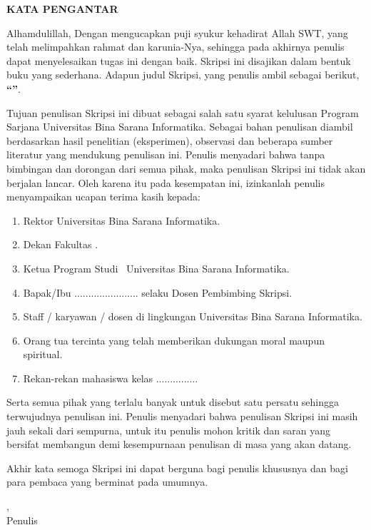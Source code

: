 ﻿\clearpage
{}
\begin{center}
    \textbf{\large KATA PENGANTAR}
\end{center}
\vspace{1cm}
Alhamdulillah, Dengan mengucapkan puji syukur kehadirat Allah SWT, yang telah melimpahkan rahmat dan karunia-Nya, sehingga pada akhirnya penulis dapat menyelesaikan tugas ini dengan baik. Skripsi ini disajikan dalam bentuk buku yang sederhana. Adapun judul Skripsi, yang penulis ambil sebagai berikut, \textbf{“\Judul”}.

Tujuan penulisan Skripsi ini dibuat sebagai salah satu syarat kelulusan Program Sarjana Universitas Bina Sarana Informatika. Sebagai bahan penulisan diambil berdasarkan hasil penelitian (eksperimen), observasi dan beberapa sumber literatur yang mendukung penulisan ini. Penulis menyadari bahwa tanpa bimbingan dan dorongan dari semua pihak, maka penulisan Skripsi ini tidak akan berjalan lancar. Oleh karena itu pada kesempatan ini, izinkanlah penulis menyampaikan ucapan terima kasih kepada:
\begin{enumerate}
    \item Rektor Universitas Bina Sarana Informatika.
    \item Dekan Fakultas \Fakultas.
    \item Ketua Program Studi \ProgramStudi\ Universitas Bina Sarana Informatika.
    \item Bapak/Ibu ....................... selaku Dosen Pembimbing Skripsi.
    \item Staff / karyawan / dosen di lingkungan Universitas Bina Sarana Informatika.
    \item Orang tua tercinta yang telah memberikan dukungan moral maupun spiritual.
    \item Rekan-rekan mahasiswa kelas ...............
\end{enumerate}

Serta semua pihak yang terlalu banyak untuk disebut satu persatu sehingga terwujudnya penulisan ini. Penulis menyadari bahwa penulisan Skripsi ini masih jauh sekali dari sempurna, untuk itu penulis mohon kritik dan saran yang bersifat membangun demi kesempurnaan penulisan di masa yang akan datang.

Akhir kata semoga Skripsi ini dapat berguna bagi penulis khususnya dan bagi para pembaca yang berminat pada umumnya.\\[1cm]
\begin{flushright}
\Kota, \Tahun\\
Penulis\\[2cm]
\textbf{\underline{\Nama}}
\end{flushright}
